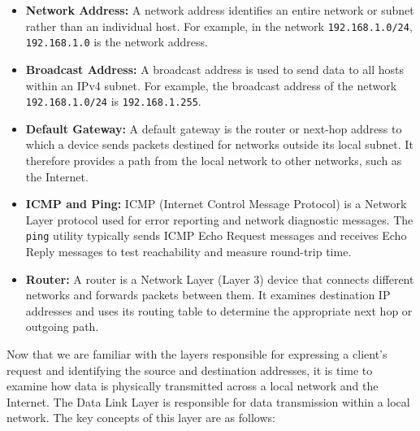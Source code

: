 \documentclass[journal]{IEEEtran}
\begin{document}
\begin{itemize}
    \item \textbf{Network Address:} A network address identifies an entire network or subnet rather than an individual host. For example, in the network \texttt{192.168.1.0/24}, \texttt{192.168.1.0} is the network address.

    \item \textbf{Broadcast Address:} A broadcast address is used to send data to all hosts within an IPv4 subnet. For example, the broadcast address of the network \texttt{192.168.1.0/24} is \texttt{192.168.1.255}.

    \item \textbf{Default Gateway:} A default gateway is the router or next-hop address to which a device sends packets destined for networks outside its local subnet. It therefore provides a path from the local network to other networks, such as the Internet.

    \item \textbf{ICMP and Ping:} ICMP (Internet Control Message Protocol) is a Network Layer protocol used for error reporting and network diagnostic messages. The \texttt{ping} utility typically sends ICMP Echo Request messages and receives Echo Reply messages to test reachability and measure round-trip time.

    \item \textbf{Router:} A router is a Network Layer (Layer 3) device that connects different networks and forwards packets between them. It examines destination IP addresses and uses its routing table to determine the appropriate next hop or outgoing path.
\end{itemize}


Now that we are familiar with the layers responsible for expressing a client's request and identifying the source and destination addresses, it is time to examine how data is physically transmitted across a local network and the Internet. The Data Link Layer is responsible for data transmission within a local network. The key concepts of this layer are as follows:
\end{document}
